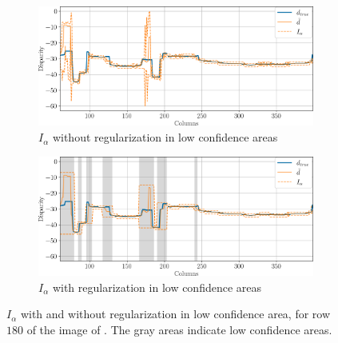 \begin{figure}
    \centering
    \begin{subfigure}[t]{\linewidth}
        \centering
        \includegraphics[width=\linewidth]{Images/Chap_5/intervals_ambiguous_area_row_180_1.png}
        \caption{$I_\alpha$ without regularization in low confidence areas}
        \label{fig:intervals_ambiguous_row_180_1}
    \end{subfigure}\hfill
    \begin{subfigure}[t]{\linewidth}
        \centering
        \includegraphics[width=\linewidth]{Images/Chap_5/intervals_ambiguous_area_row_180_2.png}
        \caption{$I_\alpha$ with regularization in low confidence areas}
        \label{fig:intervals_ambiguous_row_180_2}
    \end{subfigure}
    \caption{$I_\alpha$ with and without regularization in low confidence area, for row $180$ of the image of . The gray areas indicate low confidence areas.}
    \label{fig:intervals_ambiguous_row_180}
\end{figure}

